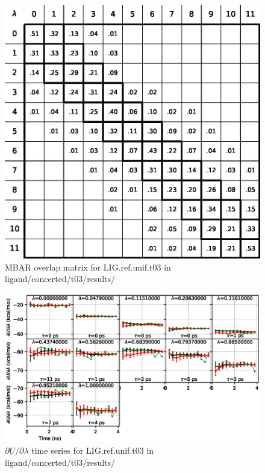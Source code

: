 \documentclass[journal=jctcce,manuscript=article,hyperref=false]{achemso}
\begin{document}
\begin{figure}
\includegraphics[clip,width=6in]{ligand.concerted.t03.results..S.eps}\vspace{-0.3cm}
\caption{MBAR overlap matrix for LIG.ref.unif.t03 in ligand/concerted/t03/results/}
\end{figure}


\begin{figure}
\includegraphics[clip,width=6in]{ligand.concerted.t03.results..DVDLvsT.eps}\vspace{-0.3cm}
\caption{$\partial U/\partial\lambda$ time series for LIG.ref.unif.t03 in ligand/concerted/t03/results/}
\end{figure}
\end{document}
